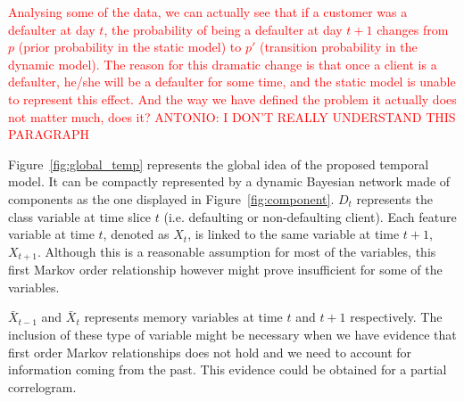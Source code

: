 \textcolor{red}{Analysing some of the data, we can actually see that if a customer was a defaulter at day $t$, the probability of being a defaulter at day $t+1$ changes from $p$ (prior probability in the static model) to $p'$ (transition probability in the dynamic model). The reason for this dramatic change is that once a client is a defaulter, he/she will be a defaulter for some time, and the static model is unable to represent this effect. }\textcolor{red}{ And the way we have defined the problem it actually does not matter much, does it? ANTONIO: I DON'T REALLY UNDERSTAND THIS PARAGRAPH} 




%  
%  
%  
%  
%  




Figure~\ref{fig:global_temp} represents the global idea of the proposed temporal model. It can be compactly represented by a dynamic Bayesian network made of components as the one displayed in 
Figure~\ref{fig:component}. $D_t$ represents the class variable at time slice $t$ (i.e. defaulting or non-defaulting client). Each feature variable at time $t$, denoted as $X_t$, is linked to the same variable at time $t+1$, $X_{t+1}$. Although this is a reasonable assumption for most of the variables, this first Markov order relationship however might prove insufficient for some of the variables.

$\bar{X}_{t-1}$ and $\bar{X}_{t}$ represents memory variables at time $t$ and $t+1$ respectively. The inclusion of these type of variable might be necessary when we have evidence that first order Markov relationships does not hold and we need to account for information coming from the past. This evidence could be obtained for a partial correlogram.

